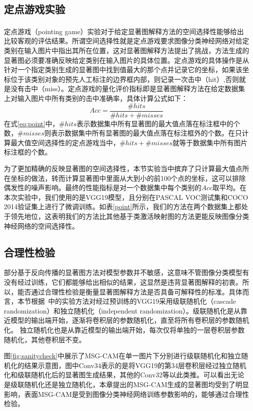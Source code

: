 \subsection{定点游戏实验}
定点游戏（pointing game）\textsuperscript{\cite{zhang2018top}}实验对于给定显著图解释方法的空间选择性能够给出比较客观的评估结果。所谓空间选择性就是定点游戏要求图像分类神经网络对给定类别在输入图片中指出其所在位置，这对显著图解释方法提出了挑战，方法生成的显著图必须要准确反映给定类别在输入图片的具体位置。定点游戏的具体操作是从针对一个指定类别生成的显著图中找到值最大的那个点并记录它的坐标，如果该坐标位于该类别对象的预先人工标注的边界框内部，则记录一次击中（hit）,否则就是没有击中（miss）。定点游戏的量化评价指标即是显著图解释方法在给定数据集上对输入图片中所有类别的击中准确率，具体计算公式如下：
\begin{equation}
	Acc=\frac{\#hits}{\#hits+\#misses}
\label{eq:point}
\end{equation}
在式\ref{eq:point}中，$\#hits$表示数据集中所有显著图的最大值点落在标注框中的个数，$\#misses$则表示数据集中所有显著图的最大值点落在标注框外的个数。在只计算最大值空间选择性的定点游戏当中，$\#hits+\#misses$就等于数据集中所有图片标注框的个数。

为了更加精确的反映显著图的空间选择性，本节实验当中摈弃了只计算最大值点所在坐标的做法，转而计算显著图中里面从大到小的前100个点的坐标，这可以排除偶发性的噪声影响。最终的性能指标是对一个数据集中每个类别的$Acc$取平均。在本次实验中，我们使用的是VGG19模型，且分别在PASCAL VOC测试集和COCO 2014验证集上进行了微调训练。如表\ref{point}所示，我们的方法在两个数据集上都处于领先地位，这表明我们的方法比其他基于类激活映射图的方法更能反映图像分类神经网络的空间选择性。

\subsection{合理性检验}
部分基于反向传播的显著图方法对模型参数并不敏感，这意味不管图像分类模型有没有经过训练，它们都能够给出相似的结果，这显然是违背显著图解释的初衷。所以，能否通过合理性检验是衡量显著图解释方法是否具备可解释性的标准。具体而言，本节根据~\cite{adebayo2018sanity}中的实验方法对经过预训练的VGG19采用级联随机化（cascade randomization）和独立随机化（independent randomization）。级联随机化是从靠近模型的输出端开始，逐渐将卷积层的参数随机化，直至将所有卷积层的参数随机化。 独立随机化也是从靠近模型的输出端开始，每次仅将单独的一层卷积层参数随机化，其他卷积层不变。

图\ref{fig:sanitycheck}中展示了MSG-CAM在单一图片下分别进行级联随机化和独立随机化的结果示意图，图中Conv34表示的是将VGG19的第34层卷积层经过独立随机化和级联随机化后的显著图生成结果，其他的Conv32等以此类推。可以看出无论是级联随机化还是独立随机化，本章提出的MSG-CAM生成的显著图均受到了明显影响，表面MSG-CAM是受到图像分类神经网络训练参数影响的，能够通过合理性检验。

